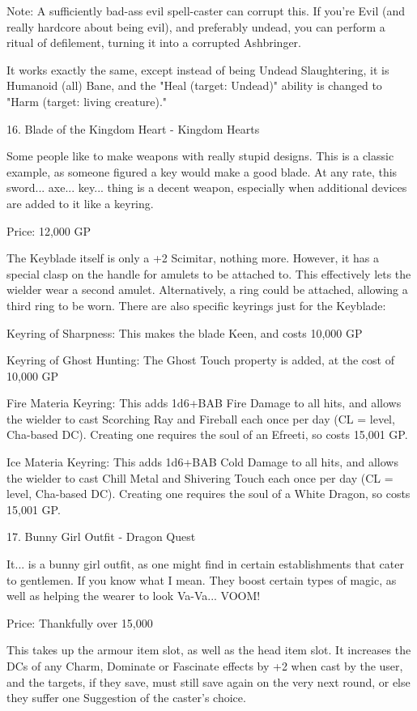 \begin{multicols}{2}
Note: A sufficiently bad-ass evil spell-caster can corrupt this. If you're Evil (and really hardcore about being evil), and preferably undead, you can perform a ritual of defilement, turning it into a corrupted Ashbringer.

It works exactly the same, except instead of being Undead Slaughtering, it is Humanoid (all) Bane, and the "Heal (target: Undead)" ability is changed to "Harm (target: living creature)."


16. Blade of the Kingdom Heart - Kingdom Hearts

Some people like to make weapons with really stupid designs. This is a classic example, as someone figured a key would make a good blade. At any rate, this sword... axe... key... thing is a decent weapon, especially when additional devices are added to it like a keyring.

Price: 12,000 GP

The Keyblade itself is only a +2 Scimitar, nothing more. However, it has a special clasp on the handle for amulets to be attached to. This effectively lets the wielder wear a second amulet. Alternatively, a ring could be attached, allowing a third ring to be worn. There are also specific keyrings just for the Keyblade:

Keyring of Sharpness: This makes the blade Keen, and costs 10,000 GP

Keyring of Ghost Hunting: The Ghost Touch property is added, at the cost of 10,000 GP

Fire Materia Keyring: This adds 1d6+BAB Fire Damage to all hits, and allows the wielder to cast Scorching Ray and Fireball each once per day (CL = level, Cha-based DC). Creating one requires the soul of an Efreeti, so costs 15,001 GP.

Ice Materia Keyring: This adds 1d6+BAB Cold Damage to all hits, and allows the wielder to cast Chill Metal and Shivering Touch each once per day (CL = level, Cha-based DC). Creating one requires the soul of a White Dragon, so costs 15,001 GP.


17. Bunny Girl Outfit - Dragon Quest

It... is a bunny girl outfit, as one might find in certain establishments that cater to gentlemen. If you know what I mean. They boost certain types of magic, as well as helping the wearer to look Va-Va... VOOM!

Price: Thankfully over 15,000

This takes up the armour item slot, as well as the head item slot. It increases the DCs of any Charm, Dominate or Fascinate effects by +2 when cast by the user, and the targets, if they save, must still save again on the very next round, or else they suffer one Suggestion of the caster's choice.


\end{multicols}
